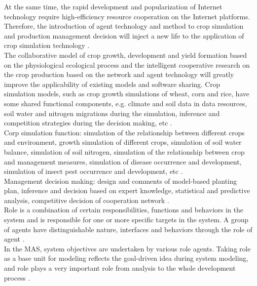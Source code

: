 \documentclass[letterpaper, 10 pt, conference]{ieeeconf}  %
\begin{document}
At the same time, the rapid development and popularization of Internet technology require high-efficiency resource cooperation on the Internet platforms. Therefore, the introduction of agent technology and method to crop simulation and production management decision will inject a new life to the application of crop simulation technology \cite{Ye-ping2011}. \\

The collaborative model of crop growth, development and yield formation based on the physiological ecological process and the intelligent cooperative research on the crop production based on the network and agent technology will greatly improve the applicability of existing models and software sharing.
Crop simulation models, such as crop growth simulations of wheat, corn and rice, have some shared functional components, e.g. climate and soil data in data resources, soil water and nitrogen migrations during the simulation, inference and competition strategies during the decision making, etc  \cite{Ye-ping2011}. \\

Corp simulation function: simulation of the relationship between different crops and environment, growth simulation of different crops, simulation of soil water balance, simulation of soil nitrogen, simulation of the relationship between crop and management measures, simulation of disease occurrence and development, simulation of insect pest occurrence and development, etc  \cite{Ye-ping2011}. \\

Management decision making: design and comments of model-based planting plan, inference and decision based on expert knowledge, statistical and predictive analysis, competitive decision of cooperation network \cite{Ye-ping2011}. \\

Role is a combination of certain responsibilities, functions and behaviors in the system and is responsible for one or more specific targets in the system. A group of agents have distinguishable nature, interfaces and behaviors through the role of agent  \cite{Ye-ping2011}. \\

In the MAS, system objectives are undertaken by various role agents. Taking role as a base unit for modeling reflects the goal-driven idea during system modeling, and role plays a very important role from analysis to the whole development process  \cite{Ye-ping2011}. \\
\end{document}
